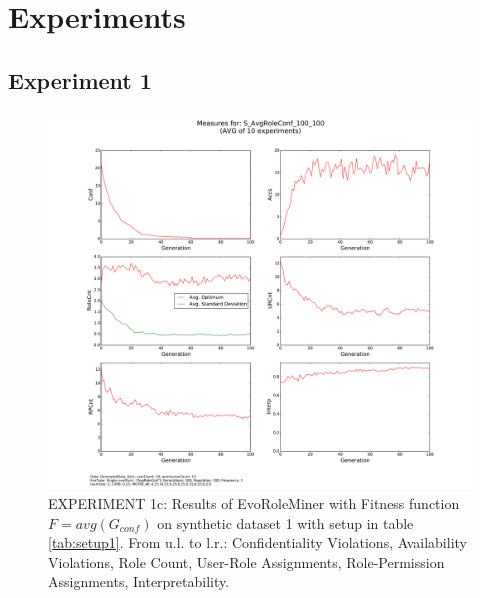 \newpage
\section{Experiments}
\label{sec:AppendixB}

\subsection{Experiment 1}
    \begin{figure}[H]
        \centering
        \includegraphics[scale=0.33, trim=4cm 2cm 4cm 0cm, clip=true]{./Figures/exp1avgConf}
        \caption{EXPERIMENT 1c: Results of EvoRoleMiner with Fitness function $F=avg(G_{conf})$ on synthetic dataset 1 with setup in table \ref{tab:setup1}. From u.l. to l.r.: Confidentiality Violations, Availability Violations, Role Count, User-Role Assignments, Role-Permission Assignments, Interpretability.}
        \label{fig:exp1avgConf}
    \end{figure}
    
